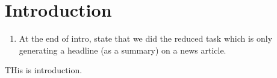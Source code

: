 \section{Introduction}

\begin{enumerate}
\item At the end of intro, state that we did the reduced task which is only generating a headline (as a summary) on a news article.
\end{enumerate}
THis is introduction. 

